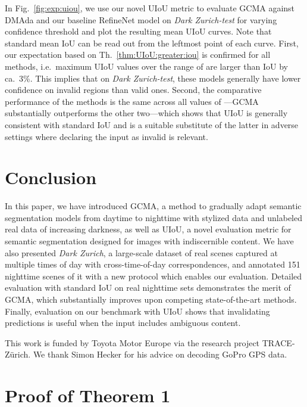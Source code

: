 \documentclass[10pt,twocolumn,letterpaper]{article}
\newcommand{\PAR}[1]{\vskip4pt \noindent{\bf #1~}}
\begin{document}
\PAR{Comparisons with UIoU.}
In Fig.~\ref{fig:exp:uiou}, we use our novel UIoU metric to evaluate GCMA against DMAda and our baseline RefineNet model on \emph{Dark Zurich-test} for varying confidence threshold  and plot the resulting mean UIoU curves. Note that standard mean IoU can be read out from the leftmost point of each curve. First, our expectation based on Th.~\ref{thm:UIoU:greater:iou} is confirmed for all methods, i.e.\ maximum UIoU values over the range of  are larger than IoU by ca.\ 3\%. This implies that on \emph{Dark Zurich-test}, these models generally have lower confidence on invalid regions than valid ones. Second, the comparative performance of the methods is the same across all values of  ---GCMA substantially outperforms the other two---which shows that UIoU is generally consistent with standard IoU and is a suitable substitute of the latter in adverse settings where declaring the input as invalid is relevant.


\section{Conclusion}
\label{sec:conclusion}

In this paper, we have introduced GCMA, a method to gradually adapt semantic segmentation models from daytime to nighttime with stylized data and unlabeled real data of increasing darkness, as well as UIoU, a novel evaluation metric for semantic segmentation designed for images with indiscernible content. We have also presented \emph{Dark Zurich}, a large-scale dataset of real scenes captured at multiple times of day with cross-time-of-day correspondences, and annotated 151 nighttime scenes of it with a new protocol which enables our evaluation. Detailed evaluation with standard IoU on real nighttime sets demonstrates the merit of GCMA, which substantially improves upon competing state-of-the-art methods. Finally, evaluation on our benchmark with UIoU shows that invalidating predictions is useful when the input includes ambiguous content.

\PAR{Acknowledgements.}
This work is funded by Toyota Motor Europe via the research project TRACE-Z\"urich. We thank Simon Hecker for his advice on decoding GoPro GPS data.

{\small


}

\appendix
\clearpage
{}

\section{Proof of Theorem 1}
\label{supp:sec:proof}
\end{document}
